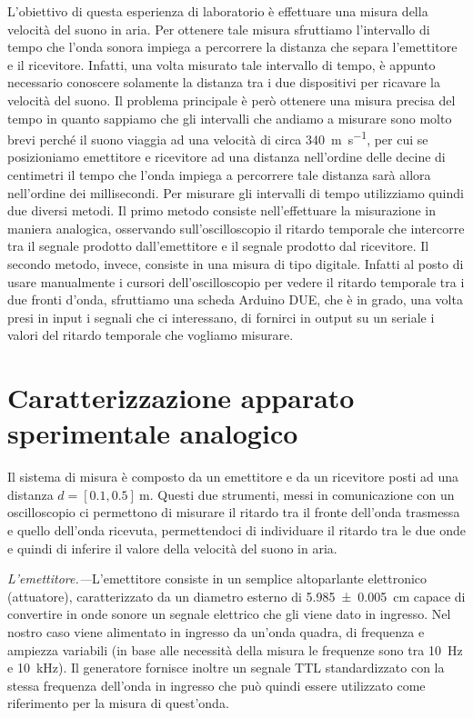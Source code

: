 \documentclass[
    prl,
    reprint, 
    superscriptaddress, 
    altaffilletter, 
    amsmath, 
    amssymb, 
    a4paper,
    varvw]{revtex4-2}
\begin{document}
L'obiettivo di questa esperienza di laboratorio è effettuare una misura della velocità del suono in aria. Per ottenere tale misura sfruttiamo l'intervallo di tempo che l'onda sonora impiega a percorrere la distanza che separa l'emettitore e il ricevitore. Infatti, una volta misurato tale intervallo di tempo, è appunto necessario conoscere solamente la distanza tra i due dispositivi per ricavare la velocità del suono. Il problema principale è però ottenere una misura precisa del tempo in quanto sappiamo che gli intervalli che andiamo a misurare sono molto brevi perché il suono viaggia ad una velocità di circa \SI{340}{\metre\per\second}, per cui se posizioniamo emettitore e ricevitore ad una distanza nell'ordine delle decine di centimetri il tempo che l'onda impiega a percorrere tale distanza sarà allora nell'ordine dei millisecondi. 
Per misurare gli intervalli di tempo utilizziamo quindi due diversi metodi. Il primo metodo consiste nell'effettuare la misurazione in maniera analogica, osservando sull'oscilloscopio il ritardo temporale che intercorre tra il segnale prodotto dall'emettitore e il segnale prodotto dal ricevitore. Il secondo metodo, invece, consiste in una misura di tipo digitale. Infatti al posto di usare manualmente i cursori dell'oscilloscopio per vedere il ritardo temporale tra i due fronti d'onda, sfruttiamo una scheda Arduino DUE, che è in grado, una volta presi in input i segnali che ci interessano, di fornirci in output su un seriale i valori del ritardo temporale che vogliamo misurare.  

\section{Caratterizzazione apparato sperimentale analogico}\label{se:II_caratterizzazione}

Il sistema di misura è composto da un emettitore e da un ricevitore posti ad una distanza $d=[0.1, 0.5]~\si{\metre}$. Questi due strumenti, messi in comunicazione con un oscilloscopio ci permettono di misurare il ritardo tra il fronte dell'onda trasmessa e quello dell'onda ricevuta, permettendoci di individuare il ritardo tra le due onde e quindi di inferire il valore della velocità del suono in aria. 

\textit{L'emettitore.---}L'emettitore consiste in un semplice altoparlante elettronico (attuatore), caratterizzato da un diametro esterno di \SI{5.985+-0.005}{\centi\metre} capace di convertire in onde sonore un segnale elettrico che gli viene dato in ingresso. Nel nostro caso viene alimentato in ingresso da un'onda quadra, di frequenza e ampiezza variabili (in base alle necessità della misura le frequenze sono tra \SI{10}{\hertz} e \SI{10}{\kilo\hertz}). Il generatore fornisce inoltre un segnale TTL standardizzato con la stessa frequenza dell'onda in ingresso che può quindi essere utilizzato come riferimento per la misura di quest'onda.
\end{document}
